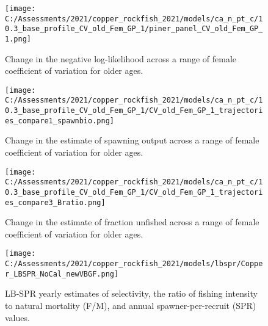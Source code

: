 \documentclass[11pt,
  english,
  a4paper,
]{article}
\begin{document}
\begin{figure}
\centering
\texttt{[image: C:/Assessments/2021/copper\_rockfish\_2021/models/ca\_n\_pt\_c/10.3\_base\_profile\_CV\_old\_Fem\_GP\_1/piner\_panel\_CV\_old\_Fem\_GP\_1.png]}
\caption{Change in the negative log-likelihood across a range of female coefficient of variation for older ages.\label{fig:cv-profile}}
\end{figure}

\tagmcend\tagstructend


\begin{figure}
\centering
\texttt{[image: C:/Assessments/2021/copper\_rockfish\_2021/models/ca\_n\_pt\_c/10.3\_base\_profile\_CV\_old\_Fem\_GP\_1/CV\_old\_Fem\_GP\_1\_trajectories\_compare1\_spawnbio.png]}
\caption{Change in the estimate of spawning output across a range of female coefficient of variation for older ages.\label{fig:cv-ssb}}
\end{figure}

\tagmcend\tagstructend


\begin{figure}
\centering
\texttt{[image: C:/Assessments/2021/copper\_rockfish\_2021/models/ca\_n\_pt\_c/10.3\_base\_profile\_CV\_old\_Fem\_GP\_1/CV\_old\_Fem\_GP\_1\_trajectories\_compare3\_Bratio.png]}
\caption{Change in the estimate of fraction unfished across a range of female coefficient of variation for older ages.\label{fig:cv-depl}}
\end{figure}

\tagmcend\tagstructend

\newpage


\begin{figure}
\centering
\texttt{[image: C:/Assessments/2021/copper\_rockfish\_2021/models/lbspr/Copper\_LBSPR\_NoCal\_newVBGF.png]}
\caption{LB-SPR yearly estimates of selectivity, the ratio of fishing intensity to natural mortality (F/M), and annual spawner-per-recruit (SPR) values.\label{fig:lbspr}}
\end{figure}

\tagmcend\tagstructend

\newpage
\end{document}
